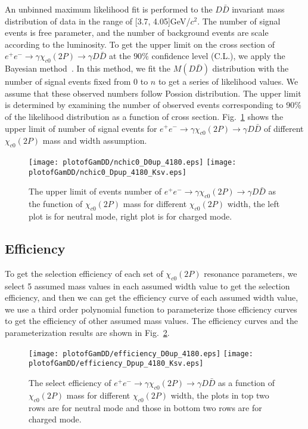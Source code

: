 \documentclass[aps,preprint,tightenlines,superscriptaddress,showpacs,byrevtex,amsmath,amssymb,nofloatfix]{revtex4}
\begin{document}
An unbinned maximum likelihood fit is performed to the $D\bar{D}$  invariant mass distribution of data in the range of [3.7, 4.05]GeV/$c^{2}$. The number of signal events is free parameter, and the number of background events are scale according to the luminosity.  To get the upper limit on the cross section of $e^{+}e^{-}\rightarrow \gamma \chi_{c0} (2P)\rightarrow \gamma D\bar{D}$  at the $90\%$ confidence level (C.L.),  we apply the Bayesian method~\cite{upperlimit}. In this method, we fit the $M(D\bar{D})$ distribution with the number of signal events fixed from 0 to $n$ to get a series of likelihood values. We assume that these observed numbers follow Possion distribution.  The upper limit is determined by examining the  number of observed events  corresponding to 90\% of the likelihood distribution as a function of cross section. Fig.~\ref{nchic0_up} shows the upper limit of number of signal events for $e^{+}e^{-}\rightarrow \gamma \chi_{c0} (2P)\rightarrow \gamma D\bar{D}$  of different $\chi_{c0} (2P)$ mass and width assumption.

\begin{figure}[!htbp]
 \captionsetup{justification=raggedright}
    \texttt{[image: plotofGamDD/nchic0\_D0up\_4180.eps]}
    \texttt{[image: plotofGamDD/nchic0\_Dpup\_4180\_Ksv.eps]}

  \caption{\small The upper limit of events number of $e^{+}e^{-}\rightarrow \gamma \chi_{c0} (2P)\rightarrow \gamma D\bar{D}$ as the function of $\chi_{c0} (2P)$ mass for different $\chi_{c0} (2P)$ width, the left plot is for neutral mode, right plot is for charged mode.}
  \label{nchic0_up}
\end{figure}

\subsection{Efficiency}

To get the selection efficiency of each set of $\chi_{c0} (2P)$ resonance parameters, we select 5 assumed mass values in each assumed width value to get the selection efficiency, and then we can get the efficiency curve of each assumed width value, we use a third order polynomial function to parameterize those efficiency curves to get the efficiency of other assumed mass values. The  efficiency curves and the  parameterization results are shown in Fig.~\ref{efficiency_chic0}.

\begin{figure}[!htbp]
\captionsetup{justification=raggedright}
    \texttt{[image: plotofGamDD/efficiency\_D0up\_4180.eps]}
    \texttt{[image: plotofGamDD/efficiency\_Dpup\_4180\_Ksv.eps]}
  \caption{\small The select efficiency of $e^{+}e^{-}\rightarrow \gamma \chi_{c0} (2P)\rightarrow \gamma D\bar{D}$ as a function of $\chi_{c0} (2P)$ mass for different $\chi_{c0} (2P)$ width, the plots in top two rows are for neutral mode and those in bottom two rows are for charged mode.}
  \label{efficiency_chic0}
\end{figure}
\end{document}
